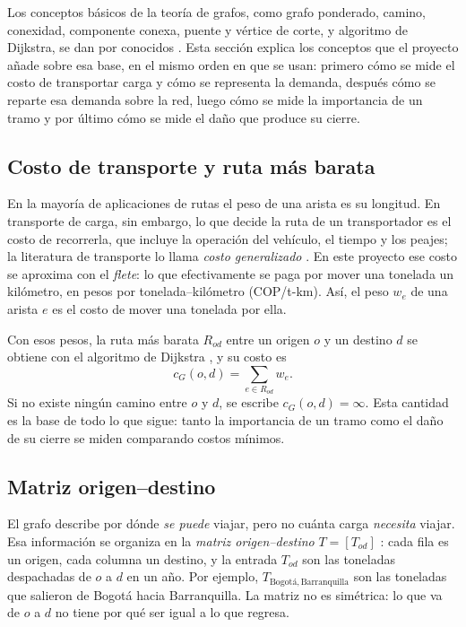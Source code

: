\documentclass[conference]{IEEEtran}
\begin{document}
Los conceptos básicos de la teoría de grafos, como grafo ponderado, camino,
conexidad, componente conexa, puente y vértice de corte, y algoritmo de Dijkstra, se dan por conocidos
\cite{diestel2017}. Esta sección explica los conceptos que el proyecto añade
sobre esa base, en el mismo orden en que se usan: primero cómo se mide el costo
de transportar carga y cómo se representa la demanda, después cómo se reparte
esa demanda sobre la red, luego cómo se mide la importancia de un tramo y por
último cómo se mide el daño que produce su cierre.

\subsection{Costo de transporte y ruta más barata}
\label{sub:costo}

En la mayoría de aplicaciones de rutas el peso de una arista es su longitud. En
transporte de carga, sin embargo, lo que decide la ruta de un transportador es
el costo de recorrerla, que incluye la operación del vehículo, el tiempo y los
peajes; la literatura de transporte lo llama \emph{costo generalizado}
\cite{ortuzar2011}. En este proyecto ese costo se aproxima con el \emph{flete}:
lo que efectivamente se paga por mover una tonelada un kilómetro, en pesos por
tonelada--kilómetro (COP/t-km). Así, el peso $w_e$ de una arista $e$ es el
costo de mover una tonelada por ella.

Con esos pesos, la ruta más barata $R_{od}$ entre un origen $o$ y un destino
$d$ se obtiene con el algoritmo de Dijkstra \cite{dijkstra1959}, y su costo es
\begin{equation}\label{eq:cmin}
c_G(o,d)=\sum_{e\in R_{od}} w_e .
\end{equation}
Si no existe ningún camino entre $o$ y $d$, se escribe $c_G(o,d)=\infty$. Esta
cantidad es la base de todo lo que sigue: tanto la importancia de un tramo como
el daño de su cierre se miden comparando costos mínimos.

\subsection{Matriz origen--destino}
\label{sub:od}

El grafo describe por dónde \emph{se puede} viajar, pero no cuánta carga
\emph{necesita} viajar. Esa información se organiza en la \emph{matriz
origen--destino} $T=[T_{od}]$ \cite{ortuzar2011}: cada fila es un origen, cada
columna un destino, y la entrada $T_{od}$ son las toneladas despachadas de $o$
a $d$ en un año. Por ejemplo, $T_{\text{Bogotá},\,\text{Barranquilla}}$ son las
toneladas que salieron de Bogotá hacia Barranquilla. La matriz no es simétrica:
lo que va de $o$ a $d$ no tiene por qué ser igual a lo que regresa.
\end{document}
